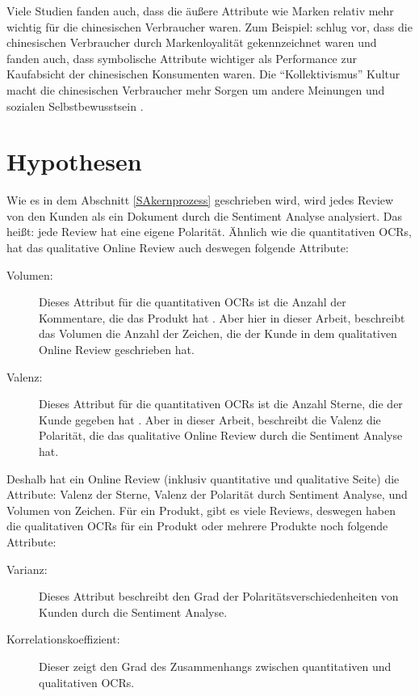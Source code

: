 Viele Studien fanden auch, dass die äußere Attribute wie Marken relativ mehr wichtig für die chinesischen Verbraucher waren. Zum Beispiel: \citet{chun1998differences} schlug vor, dass die chinesischen Verbraucher durch Markenloyalität gekennzeichnet waren und \citet{zhou2003symbolic} fanden auch, dass symbolische Attribute wichtiger als Performance zur Kaufabsicht der chinesischen Konsumenten waren. Die ``Kollektivismus'' Kultur macht die chinesischen Verbraucher mehr Sorgen um andere Meinungen und sozialen Selbstbewusstsein \citep{rahman2010evaluative}.

\section{Hypothesen} \label{sec:hypothese}
Wie es in dem Abschnitt \ref{SAkernprozess} geschrieben wird, wird jedes Review von den Kunden als ein Dokument durch die Sentiment Analyse analysiert. Das heißt: jede Review hat eine eigene Polarität. Ähnlich wie die quantitativen \ac{OCRs}, hat das qualitative Online Review auch deswegen folgende Attribute:
\begin{description}
	\item[Volumen:] Dieses Attribut für die quantitativen \ac{OCRs} ist die Anzahl der Kommentare, die das Produkt hat \citep{Shrihari2012}. Aber hier in dieser Arbeit, beschreibt das Volumen die Anzahl der Zeichen, die der Kunde in dem qualitativen Online Review geschrieben hat.
	\item[Valenz:] Dieses Attribut für die quantitativen \ac{OCRs} ist die Anzahl Sterne, die der Kunde gegeben hat \citep{Shrihari2012}. Aber in dieser Arbeit, beschreibt die Valenz die Polarität, die das qualitative Online Review durch die Sentiment Analyse hat.
\end{description}

Deshalb hat ein Online Review (inklusiv quantitative und qualitative Seite) die Attribute: Valenz der Sterne, Valenz der Polarität durch Sentiment Analyse, und Volumen von Zeichen. Für ein Produkt, gibt es viele Reviews, deswegen haben die qualitativen \ac{OCRs} für ein Produkt oder mehrere Produkte noch folgende Attribute:
\begin{description}
	\item[Varianz:] Dieses Attribut beschreibt den Grad der Polaritätsverschiedenheiten von Kunden durch die Sentiment Analyse.
	\item[Korrelationskoeffizient:] Dieser zeigt den Grad des Zusammenhangs zwischen quantitativen und qualitativen \ac{OCRs}.
\end{description}

